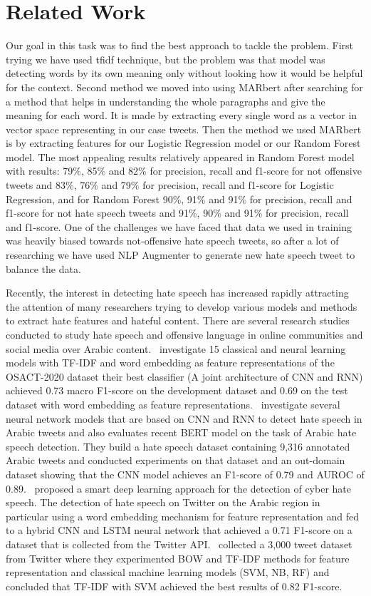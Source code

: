 \documentclass[10pt, a4paper]{article}
\begin{document}
\section{Related Work}\label{sec:related_work}
Our goal in this task was to find the best approach to tackle the problem. First trying we have used tfidf technique, but the problem was that model was detecting words by its own meaning only without looking how it would be helpful for the context. Second method we moved into using MARbert after searching for a method that helps in understanding the whole paragraphs and give the meaning for each word. It is made by extracting every single word as a vector in vector space representing in our case tweets. Then the method we used MARbert is by extracting features for our Logistic Regression model or our Random Forest model. The most appealing results relatively appeared in Random Forest model with results: 79\%, 85\% and 82\% for precision, recall and f1-score for not offensive tweets and 83\%, 76\% and 79\% for precision, recall and f1-score for Logistic Regression, and for Random Forest 90\%, 91\% and 91\% for precision, recall and f1-score for not hate speech tweets and 91\%, 90\% and 91\% for precision, recall and f1-score. One of the challenges we have faced that data we used in training was heavily biased towards not-offensive hate speech tweets, so after a lot of researching we have used NLP Augmenter to generate new hate speech tweet to balance the data.

Recently, the interest in detecting hate speech has increased rapidly attracting the attention of many researchers trying to develop various models and methods to extract hate features and hateful content. There are several research studies conducted to study hate speech and offensive language in online communities and social media over Arabic content.~\cite{abuzayed2020quick} investigate 15 classical and neural learning models with TF-IDF and word embedding as feature representations of the OSACT-2020 dataset their best classifier (A joint architecture of CNN and RNN) achieved 0.73 macro F1-score on the development dataset and 0.69 on the test dataset with word embedding as feature representations.~\cite{alshaalan2020hate} investigate several neural network models that are based on CNN and RNN to detect hate speech in Arabic tweets and also evaluates recent BERT model on the task of Arabic hate speech detection. They build a hate speech dataset containing 9,316 annotated Arabic tweets and conducted experiments on that dataset and an out-domain dataset showing that the CNN model achieves an F1-score of 0.79 and AUROC of 0.89.~\cite{faris2020hate} proposed a smart deep learning approach for the detection of cyber hate speech. The detection of hate speech on Twitter on the Arabic region in particular using a word embedding mechanism for feature representation and fed to a hybrid CNN and LSTM neural network that achieved a 0.71 F1-score on a dataset that is collected from the Twitter API.~\cite{al2020hate} collected a 3,000 tweet dataset from Twitter where they experimented BOW and TF-IDF methods for feature representation and classical machine learning models (SVM, NB, RF) and concluded that TF-IDF with SVM achieved the best results of 0.82 F1-score.
\end{document}
